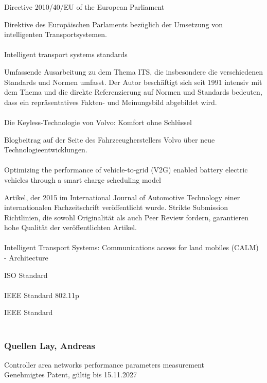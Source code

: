 Directive 2010/40/EU of the European Parliament \cite{BP04}

Direktive des Europäischen Parlaments bezüglich der Umsetzung von intelligenten Transportsystemen.\\\\

Intelligent transport systems standards \cite{BP11}

Umfassende Ausarbeitung zu dem Thema ITS, die insbesondere die verschiedenen Standards und Normen umfasst. Der Autor beschäftigt sich seit 1991 intensiv mit 
dem Thema und die direkte Referenzierung auf Normen und Standards bedeuten, dass ein repräsentatives Fakten- und Meinungsbild abgebildet wird.\\\\

Die Keyless-Technologie von Volvo: Komfort ohne Schlüssel \cite{BP05}

Blogbeitrag auf der Seite des Fahrzeeugherstellers Volvo über neue Technologieentwicklungen.\\\\

Optimizing the performance of vehicle-to-grid (V2G) enabled battery electric vehicles through a smart charge scheduling model \cite{BP08}

Artikel, der 2015 im International Journal of Automotive Technology einer internationalen Fachzeitschrift veröffentlicht wurde. Strikte Submission Richtlinien, die sowohl
Originalität als auch Peer Review fordern, garantieren hohe Qualität der veröffentlichten Artikel.\\\\

Intelligent Transport Systems: Communications access for land mobiles (CALM) - Architecture \cite{BP09}

ISO Standard\\\\

IEEE Standard 802.11p \cite{BP10}

IEEE Standard\\\\

\subsubsection{Quellen Lay, Andreas}

Controller area networks performance parameters measurement \cite{LA_CAN1}\\
Genehmigtes Patent, gültig bis 15.11.2027\\\\

